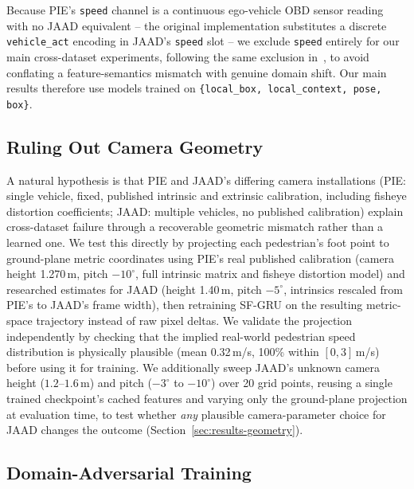 Because PIE's \texttt{speed} channel is a continuous ego-vehicle OBD
sensor reading with no JAAD equivalent -- the original implementation
substitutes a discrete \texttt{vehicle\_act} encoding in JAAD's
\texttt{speed} slot -- we exclude \texttt{speed} entirely for our main
cross-dataset experiments, following the same exclusion
in~\cite{gesnouin2022}, to avoid conflating a feature-semantics mismatch
with genuine domain shift. Our main results therefore use models
trained on \texttt{\{local\_box, local\_context, pose, box\}}.

\subsection{Ruling Out Camera Geometry}
\label{sec:method-geometry}

A natural hypothesis is that PIE and JAAD's differing camera
installations (PIE: single vehicle, fixed, published intrinsic and
extrinsic calibration, including fisheye distortion coefficients;
JAAD: multiple vehicles, no published calibration) explain cross-dataset
failure through a recoverable geometric mismatch rather than a learned
one. We test this directly by projecting each pedestrian's foot point to
ground-plane metric coordinates using PIE's real published calibration
(camera height 1.270\,m, pitch $-10^\circ$, full intrinsic matrix and
fisheye distortion model) and researched estimates for JAAD (height
1.40\,m, pitch $-5^\circ$, intrinsics rescaled from PIE's to JAAD's
frame width), then retraining SF-GRU on the resulting metric-space
trajectory instead of raw pixel deltas. We validate the projection
independently by checking that the implied real-world pedestrian speed
distribution is physically plausible (mean 0.32\,m/s, 100\% within
$[0,3]$\,m/s) before using it for training. We additionally sweep
JAAD's unknown camera height ($1.2$--$1.6$\,m) and pitch ($-3^\circ$ to
$-10^\circ$) over 20 grid points, reusing a single trained checkpoint's
cached features and varying only the ground-plane projection at
evaluation time, to test whether \emph{any} plausible camera-parameter
choice for JAAD changes the outcome (Section~\ref{sec:results-geometry}).

\subsection{Domain-Adversarial Training}
\label{sec:method-dann}

